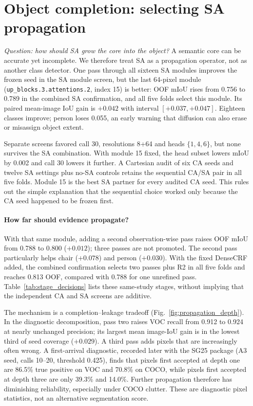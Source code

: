 \section{Object completion: selecting SA propagation}
\label{sec:sa}
\emph{Question: how should SA grow the core into the object?} A semantic core can be accurate yet incomplete. We therefore treat SA as a propagation operator, not as another class detector. One pass through all sixteen SA modules improves the frozen seed in the SA module screen, but the last 64-pixel module (\texttt{up\_blocks.3.attentions.2}, index 15) is better: OOF mIoU rises from 0.756 to 0.789 in the combined SA confirmation, and all five folds select this module. Its paired mean-image IoU gain is $+0.042$ with interval $[+0.037,+0.047]$. Eighteen classes improve; person loses 0.055, an early warning that diffusion can also erase or misassign object extent.

Separate screens favored call 30, resolutions 8+64 and heads $\{1,4,6\}$, but none survives the SA combination. With module 15 fixed, the head subset lowers mIoU by 0.002 and call 30 lowers it further. A Cartesian audit of six CA seeds and twelve SA settings plus no-SA controls retains the sequential CA/SA pair in all five folds. Module 15 is the best SA partner for every audited CA seed. This rules out the simple explanation that the sequential choice worked only because the CA seed happened to be frozen first.

\paragraph{How far should evidence propagate?}
With that same module, adding a second observation-wise pass raises OOF mIoU from 0.788 to 0.800 ($+0.012$); three passes are not promoted. The second pass particularly helps chair ($+0.078$) and person ($+0.030$). With the fixed DenseCRF added, the combined confirmation selects two passes plus R2 in all five folds and reaches 0.813 OOF, compared with 0.788 for one unrefined pass. Table~\ref{tab:stage_decisions} lists these same-study stages, without implying that the independent CA and SA screens are additive.

The mechanism is a completion--leakage tradeoff (Fig.~\ref{fig:propagation_depth}). In the diagnostic decomposition, pass two raises VOC recall from 0.912 to 0.924 at nearly unchanged precision; its largest mean image-IoU gain is in the lowest third of seed coverage ($+0.029$). A third pass adds pixels that are increasingly often wrong. A first-arrival diagnostic, recorded later with the SG25 package (A3 seed, calls 10--20, threshold 0.425), finds that pixels first accepted at depth one are 86.5\% true positive on VOC and 70.8\% on COCO, while pixels first accepted at depth three are only 39.3\% and 14.0\%. Further propagation therefore has diminishing reliability, especially under COCO clutter. These are diagnostic pixel statistics, not an alternative segmentation score.

